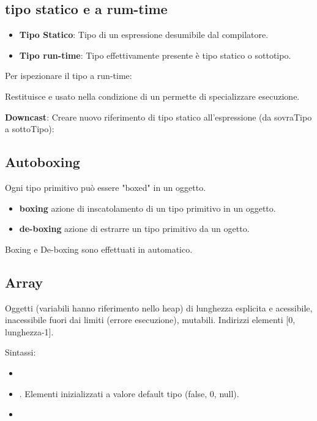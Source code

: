 \subsection{tipo statico e a rum-time}
\begin{itemize}
	\item \textbf{Tipo Statico}: Tipo di un espressione desumibile dal compilatore.
	\item \textbf{Tipo run-time}: Tipo effettivamente presente è tipo statico o sottotipo.
\end{itemize}

Per ispezionare il tipo a run-time:


Restituisce  e usato nella condizione di un  permette di specializzare esecuzione.
\bigskip

\textbf{Downcast}: Creare nuovo riferimento di tipo statico all'espressione (da sovraTipo a sottoTipo):


\subsection{Autoboxing}
Ogni tipo primitivo può essere "boxed" in un oggetto.

\begin{itemize}
	\item \textbf{boxing} azione di inscatolamento di un tipo primitivo in un oggetto.
	\item \textbf{de-boxing} azione di estrarre un tipo primitivo da un ogetto.
\end{itemize}

Boxing e De-boxing sono effettuati in automatico.

\subsection{Array}
Oggetti (variabili hanno riferimento nello heap) di lunghezza esplicita e acessibile, inacessibile fuori dai limiti (errore esecuzione), mutabili. Indirizzi elementi [0, lunghezza-1].

Sintassi:
\begin{itemize}
	\item {}
	\item {}. Elementi inizializzati a valore default tipo (false, 0, null).
	\item {}
\end{itemize}

